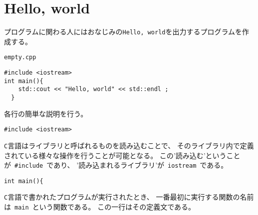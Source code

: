 \section{Hello, world}
プログラムに関わる人にはおなじみの\texttt{Hello, world}を出力するプログラムを作成する。
\begin{itembox}{\texttt{empty.cpp}}
\begin{verbatim}
#include <iostream>
int main(){
    std::cout << "Hello, world" << std::endl ;
  }
\end{verbatim}
\end{itembox}
各行の簡単な説明を行う。
{\color{red}\begin{verbatim}
#include <iostream>
\end{verbatim} }
\texttt{C}言語はライブラリと呼ばれるものを読み込むことで、
そのライブラリ内で定義されている様々な操作を行うことが可能となる。
この'読み込む'ということが\ \verb|#include|\ であり、
'読み込まれるライブラリ'が\ \texttt{iostream}\ である。
{\color{red}\begin{verbatim}
int main(){
\end{verbatim}}
\texttt{C}言語で書かれたプログラムが実行されたとき、
一番最初に実行する関数の名前は\ \texttt{main}\ という関数である。
この一行はその定義文である。
